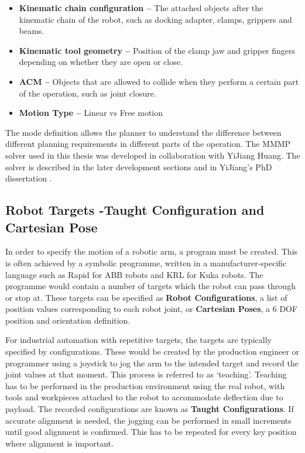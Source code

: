 \begin{itemize}
	\item \textbf{Kinematic chain configuration --} The attached objects after the kinematic chain of the robot, such as docking adapter, clamps, grippers and beams.
	\item \textbf{Kinematic tool geometry --} Position of the clamp jaw and gripper fingers depending on whether they are open or close.
	\item \textbf{ACM --} Objects that are allowed to collide when they perform a certain part of the operation, such as joint closure.
	\item \textbf{Motion Type --} Linear vs Free motion
\end{itemize}

The mode definition allows the planner to understand the difference between different planning requirements in different parts of the operation. The MMMP solver used in this thesis was developed in collaboration with YiJiang Huang. The solver is described in the later development sections  and in YiJiang’s PhD dissertation \parencite{huangAlgorithmicPlanningRobotic2022}.

\subsection{Robot Targets -Taught Configuration and Cartesian Pose}
\label{subsection:exploration-3-robot-targets-taught-configuration-and-cartesian-pose}

In order to specify the motion of a robotic arm, a program must be created. This is often achieved by a symbolic programme, written in a manufacturer-specific language such as Rapid for ABB robots and KRL for Kuka robots. The programme would contain a number of targets which the robot can pass through or stop at. These targets can be specified as \textbf{Robot Configurations}, a list of position values corresponding to each robot joint, or \textbf{Cartesian Poses}, a 6 DOF position and orientation definition.

For industrial automation with repetitive targets, the targets are typically specified by configurations. These would be created by the production engineer or programmer using a joystick to jog the arm to the intended target and record the joint values at that moment. This process is referred to as ‘teaching’. Teaching has to be performed in the production environment using the real robot, with tools and workpieces attached to the robot to accommodate deflection due to payload. The recorded configurations are known as \textbf{Taught Configurations}. If accurate alignment is needed, the jogging can be performed in small increments until good alignment is confirmed. This has to be repeated for every key position where alignment is important. 


